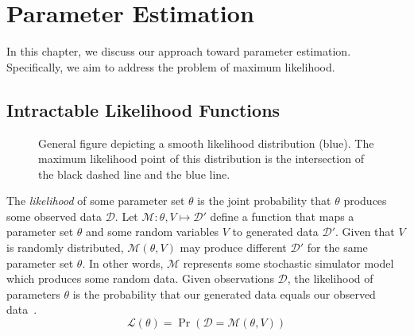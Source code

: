 \chapter{Parameter Estimation}\label{ch:parameterEstimation}
In this chapter, we discuss our approach toward parameter estimation.
Specifically, we aim to address the problem of maximum likelihood.

\section{Intractable Likelihood Functions}\label{sec:intractableLikelihoodFunctions}
\begin{figure}[t]
    \centering{}
    \caption{General figure depicting a smooth likelihood distribution (blue).
    The maximum likelihood point of this distribution is the intersection of the black dashed line and the blue line.
    }\label{fig:likelihoodGeneral}
\end{figure}

The \emph{likelihood} of some parameter set $\theta$ is the joint probability that $\theta$ produces some observed data
$\mathcal{D}$.
Let $\mathcal{M} : \theta, V \mapsto \mathcal{D}'$ define a function that maps a parameter set $\theta$ and some
random variables $V$ to generated data $\mathcal{D}'$.
Given that $V$ is randomly distributed, $\mathcal{M}(\theta, V)$ may produce different $\mathcal{D}'$ for the same
parameter set $\theta$.
In other words, $\mathcal{M}$ represents some stochastic simulator model which produces some random data.
Given observations $\mathcal{D}$, the likelihood of parameters $\theta$ is the probability that our generated data
equals our observed data~\cite{lintusaariFundamentalsRecentDevelopments2017}.
\begin{equation}\label{eq:likelihood1}
    \mathcal{L}(\theta) = \Pr(\mathcal{D} = \mathcal{M}(\theta, V))
\end{equation}

